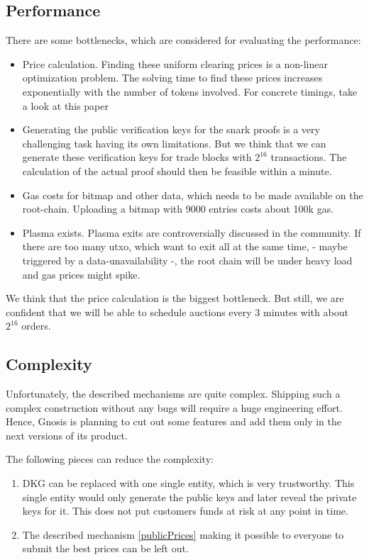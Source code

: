 \documentclass[11pt,parskip=full]{scrartcl}%
\begin{document}
\subsection{Performance}
There are some bottlenecks, which are considered for evaluating the performance:
\begin{itemize}
\item Price calculation. 
Finding these uniform clearing prices is a non-linear optimization problem. 
The solving time to find these prices increases exponentially with the number of tokens involved. For concrete timings, take a look at this paper \cite{priceOptimization}
\item Generating the public verification keys for the snark proofs is a very challenging task having its own limitations. 
But we think that we can generate these verification keys for trade blocks with $2^{16}$ transactions. 
The calculation of the actual proof should then be feasible within a minute. 
\item Gas costs for bitmap and other data, which needs to be made available on the root-chain. 
Uploading a bitmap with 9000 entries costs about 100k gas. 
\item Plasma exists.
Plasma exits are controversially discussed in the community. 
If there are too many utxo, which want to exit all at the same time, - maybe triggered by a data-unavailability -, the root chain will be under heavy load and gas prices might spike. 
\end{itemize}
We think that the price calculation is the biggest bottleneck. 
But still, we are confident that we will be able to schedule auctions every 3 minutes with about $2^{16}$ orders. 
\subsection{Complexity}
Unfortunately, the described mechanisms are quite complex. 
Shipping such a complex construction without any bugs will require a huge engineering effort. 
Hence, Gnosis is planning to cut out some features and add them only in the next versions of its product. 

The following pieces can reduce the complexity:
\begin{enumerate}
\item
DKG can be replaced with one single entity, which is very trustworthy. 
This single entity would only generate the public keys and later reveal the private keys for it. 
This does not put customers funds at risk at any point in time. 
\item
The described mechanism \ref{publicPrices} making it possible to everyone to submit the best prices can be left out. 
\end{enumerate}
\end{document}

